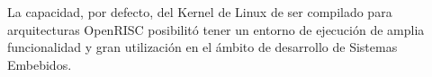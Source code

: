 	La capacidad, por defecto, del Kernel de Linux de ser compilado para arquitecturas OpenRISC posibilitó tener un entorno de ejecución de amplia
	funcionalidad y gran utilización en el ámbito de desarrollo de Sistemas Embebidos.  
	

	
	
	
	 